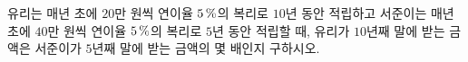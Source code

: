 유리는 매년 초에 $20$만 원씩 연이율 $5\mkern3mu \%$의 복리로 $10$년 동안 적립하고 서준이는 매년 초에 $40$만 원씩 연이율 $5\mkern3mu \%$의 복리로 $5$년 동안 적립할 때, 유리가 $10$년째 말에 받는 금액은 서준이가 $5$년째 말에 받는 금액의 몇 배인지 구하시오. 
